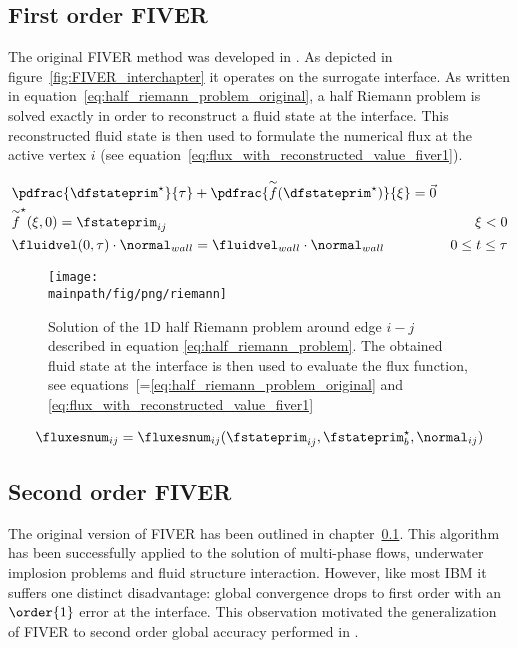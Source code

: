 \documentclass[../main.tex]{subfiles}
\begin{document}
\subsection{First order \ac{FIVER}}\label{sec:fiver-1}
The original \ac{FIVER} method was developed in \cite{Farhat2008}. As depicted in figure~\ref{fig:FIVER_interchapter} it operates on the surrogate interface. As written in equation~\eqref{eq:half_riemann_problem_original}, a half Riemann problem is solved exactly in order to reconstruct a fluid state at the interface. This reconstructed fluid state is then used to formulate the numerical flux at the active vertex $i$ (see equation~\eqref{eq:flux_with_reconstructed_value_fiver1}).


\begin{align}\label{eq:half_riemann_problem_original}
&\pdfrac{\dfstateprim^{\star}}{\tau} + \pdfrac{\overset{\sim}{f}(\dfstateprim^{\star})}{\xi} = \vec{0} & \nonumber\\
&\overset{\sim}{f}^{\star}(\xi,0)=\fstateprim_{ij}                                                     & \xi<0 \nonumber\\
&\fluidvel(0,\tau)\cdot \normal_{wall} = \fluidvel_{wall}\cdot\normal_{wall}                          & 0\leq t \leq \tau
\end{align}

\begin{figure}[h!]
	\begin{center}
        \texttt{[image: \\mainpath/fig/png/riemann]}
        \caption[Riemann Sketch]{Solution of the 1D half Riemann problem around edge $i-j$ described in equation \eqref{eq:half_riemann_problem}. The obtained fluid state at the interface is then used to evaluate the flux function, see equations~[=\eqref{eq:half_riemann_problem_original} and \eqref{eq:flux_with_reconstructed_value_fiver1}}
		\label{fig:riemann_sketch}
    \end{center}
\end{figure}

\begin{align}\label{eq:flux_with_reconstructed_value_fiver1}
\fluxesnum_{ij}=\fluxesnum_{ij}(\fstateprim_{ij},\fstateprim^{\star}_b, \normal_{ij})
\end{align}



\subsection{Second order \ac{FIVER}}\label{sec:fiver-2}
The original version of \ac{FIVER} has been outlined in chapter~\ref{sec:fiver-1}. This algorithm has been successfully applied to the solution of multi-phase flows, underwater implosion problems and fluid structure interaction. However, like most \ac{IBM} it suffers one distinct disadvantage: global convergence drops to first order with an $\order{1}$ error at the interface. This observation motivated the generalization of FIVER to second order global accuracy performed in \cite{Main2014}.\\
\end{document}
